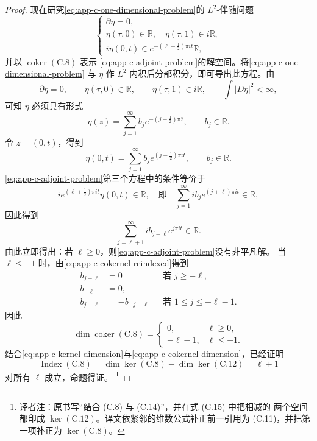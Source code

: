 \begin{proof}
现在研究\eqref{eq:app-c-one-dimensional-problem}的 $L^2$-伴随问题
\begin{equation}
\label{eq:app-c-adjoint-problem}
 \begin{cases}
 \partial\eta=0,\\
 \eta(\tau,0)\in\mathbb R,\quad\eta(\tau,1)\in i\mathbb R,\\
 i\eta(0,t)\in e^{-(\ell+\frac12)\pi it}\mathbb R,
 \end{cases}
\end{equation}
并以 $\operatorname{coker}(\mathrm{C.8})$ 表示
\eqref{eq:app-c-adjoint-problem}的解空间。将\eqref{eq:app-c-one-dimensional-problem}
与 $\eta$ 作 $L^2$ 内积后分部积分，即可导出此方程。由
\[
 \partial\eta=0,
 \qquad\eta(\tau,0)\in\mathbb R,
 \qquad\eta(\tau,1)\in i\mathbb R,
 \qquad\int|D\eta|^2<\infty,
\]
可知 $\eta$ 必须具有形式
\[
 \eta(z)=\sum_{j=1}^{\infty}b_je^{-(j-\frac12)\pi\bar z},
 \qquad b_j\in\mathbb R.
\]
令 $z=(0,t)$，得到
\[
 \eta(0,t)=\sum_{j=1}^{\infty}b_je^{(j-\frac12)\pi it},
 \qquad b_j\in\mathbb R.
\]
\eqref{eq:app-c-adjoint-problem}第三个方程中的条件等价于
\[
 ie^{(\ell+\frac12)\pi it}\eta(0,t)\in\mathbb R,
 \quad\text{即}\quad
 \sum_{j=1}^{\infty}ib_je^{(j+\ell)\pi it}\in\mathbb R,
\]
因此得到
\begin{equation}
\label{eq:app-c-cokernel-reindexed}
 \sum_{j=\ell+1}^{\infty}ib_{j-\ell}e^{j\pi it}\in\mathbb R.
\end{equation}
由此立即得出：若 $\ell\geq0$，则\eqref{eq:app-c-adjoint-problem}没有非平凡解。
当 $\ell\leq-1$ 时，由\eqref{eq:app-c-cokernel-reindexed}得到
\[
 \begin{aligned}
 b_{j-\ell}&=0&&\text{若 }j\geq-\ell,\\
 b_{-\ell}&=0,\\
 b_{j-\ell}&=-b_{-j-\ell}&&\text{若 }1\leq j\leq-\ell-1.
 \end{aligned}
\]
因此
\begin{equation}
\label{eq:app-c-cokernel-dimension}
 \dim\operatorname{coker}(\mathrm{C.8})=
 \begin{cases}
 0,&\ell\geq0,\\
 -\ell-1,&\ell\leq-1.
 \end{cases}
\end{equation}
结合\eqref{eq:app-c-kernel-dimension}与\eqref{eq:app-c-cokernel-dimension}，已经证明
\begin{equation}
\label{eq:app-c-index-from-kernel-cokernel}
 \operatorname{Index}(\mathrm{C.8})
 =\dim\ker(\mathrm{C.8})-\dim\ker(\mathrm{C.12})
 =\ell+1
\end{equation}
对所有 $\ell$ 成立，命题得证。
\footnote{译者注：原书写“结合 (C.8) 与 (C.14)”，并在式 (C.15) 中把相减的
两个空间都印成 $\ker(\mathrm{C.12})$。译文依紧邻的维数公式补正前一引用为
(C.11)，并把第一项补正为 $\ker(\mathrm{C.8})$。}
\end{proof}

